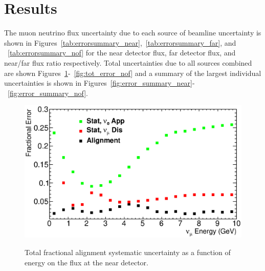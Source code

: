 \section{Results}
\label{sec:results}

The muon neutrino flux uncertainty due to each source of beamline uncertainty is shown in Figures~\ref{tab:errorsummary_near},~\ref{tab:errorsummary_far}, and ~\ref{tab:errorsummary_nof} for the near detector flux, far detector flux, and near/far flux ratio respectively.  Total uncertainties due to all sources combined are shown Figures~\ref{fig:tot_error_near}-~\ref{fig:tot_error_nof} and a summary of the largest individual uncertainties is shown in Figures~\ref{fig:error_summary_near}-~\ref{fig:error_summary_nof}.





\begin{figure}[ht]
  \label{fig:tot_error_near}
  \begin{center}
    {\includegraphics[width=6.0in]{figures/tot_error_near.eps}}
  \end{center}
\caption{ Total fractional alignment systematic uncertainty as a function of energy on the flux at the near detector. }
\end{figure}

